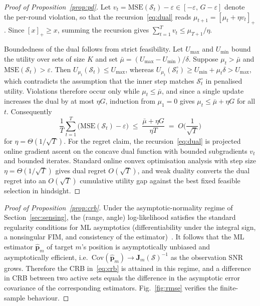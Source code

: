 \documentclass[lettersize,journal]{IEEEtran}
\newcommand{\bJ}{\bm{J}}
\newcommand{\calS}{\mathcal{S}}
\begin{document}
\begin{proof}[Proof of Proposition~\ref{prop:pd}]
Let $v_t=\mathrm{MSE}(\calS_t)-\varepsilon\in[-\varepsilon,\,G-\varepsilon]$ denote the per-round violation, so that the recursion~\eqref{eq:dual} reads $\mu_{t+1}=[\mu_t+\eta v_t]_+$. Since $[x]_+\ge x$, summing the recursion gives $\sum_{t=1}^{T}v_t\le\mu_{T+1}/\eta$.

Boundedness of the dual follows from strict feasibility. Let $U_{\max}$ and $U_{\min}$ bound the utility over sets of size $K$ and set $\bar\mu=(U_{\max}-U_{\min})/\delta$. Suppose $\mu_t>\bar\mu$ and $\mathrm{MSE}(\calS_t)>\varepsilon$. Then $U_{\mu_t}(\calS_t)\le U_{\max}$, whereas $U_{\mu_t}(\calS^{\circ}_t)\ge U_{\min}+\mu_t\delta>U_{\max}$, which contradicts the assumption that the inner step matches $\calS^{\circ}_t$ in penalised utility. Violations therefore occur only while $\mu_t\le\bar\mu$, and since a single update increases the dual by at most $\eta G$, induction from $\mu_1=0$ gives $\mu_t\le\bar\mu+\eta G$ for all $t$. Consequently
\[
\frac{1}{T}\sum_{t=1}^{T}\big(\mathrm{MSE}(\calS_t)-\varepsilon\big)\;\le\;\frac{\bar\mu+\eta G}{\eta T}\;=\;O\!\Big(\frac{1}{\sqrt{T}}\Big)
\]
for $\eta=\Theta(1/\sqrt{T})$. For the regret claim, the recursion~\eqref{eq:dual} is projected online gradient ascent on the concave dual function with bounded subgradients $v_t$ and bounded iterates. Standard online convex optimisation analysis with step size $\eta=\Theta(1/\sqrt{T})$ gives dual regret $O(\sqrt{T})$, and weak duality converts the dual regret into an $O(\sqrt{T})$ cumulative utility gap against the best fixed feasible selection in hindsight.
\end{proof}

\begin{proof}[Proof of Proposition~\ref{prop:crb}]
Under the asymptotic-normality regime of Section~\ref{sec:sensing}, the (range, angle) log-likelihood satisfies the standard regularity conditions for ML asymptotics (differentiability under the integral sign, a nonsingular FIM, and consistency of the estimator)~\cite{kay1993}. It follows that the ML estimator $\hat{\bm{p}}_m$ of target $m$'s position is asymptotically unbiased and asymptotically efficient, i.e.\ $\mathrm{Cov}(\hat{\bm{p}}_m)\to\bJ_m(\calS)^{-1}$ as the observation SNR grows. Therefore the CRB in~\eqref{eq:crb} is attained in this regime, and a difference in CRB between two active sets equals the difference in the asymptotic error covariance of the corresponding estimators. Fig.~\ref{fig:rmse} verifies the finite-sample behaviour.
\end{proof}
\end{document}
